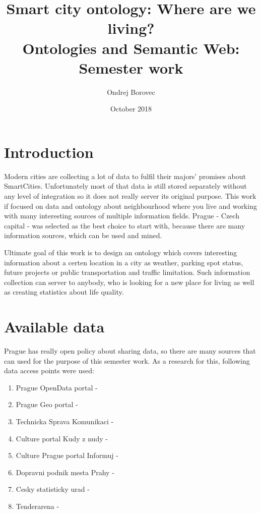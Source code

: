 \documentclass{article}
\title{Smart city ontology: Where are we living?\\ \large Ontologies and Semantic Web: Semester work}
\author{Ondrej Borovec}
\date{October 2018}
\begin{document}
\maketitle

\section{Introduction}

Modern cities are collecting a lot of data to fulfil their majors' promises about SmartCities. Unfortunately most of that data is still stored separately without any level of integration so it does not really server its original purpose. This work if focused on data and ontology about neighbourhood where you live and working with many interesting sources of multiple information fields. Prague - Czech capital - was selected as the best choice to start with, because there are many information sources, which can be used and mined.

Ultimate goal of this work is to design an ontology which covers interesting information about a certen location in a city as weather, parking spot status, future projects or public transportation and traffic limitation. Such information collection can server to anybody, who is looking for a new place for living as well as creating statistics about life quality.

\section{Available data}

Prague has really open policy about sharing data, so there are many sources that can used for the purpose of this semester work. As a research for this, following data access points were used:

\begin{enumerate}
    \item Prague OpenData portal - \cite{opendataprague:online}
    \item Prague Geo portal - \cite{geoportal:online}
    \item Technicka Sprava Komunikaci - \cite{tskpraha:online}
    \item Culture portal Kudy z nudy - \cite{kudyznudy:online}
    \item Culture Prague portal Informuj - \cite{informujpraha:online}
    \item Dopravni podnik mesta Prahy - \cite{dppczRSS:online}
    \item Cesky statisticky urad - \cite{csu:online}
    \item Tenderarena - \cite{tenderarena:online}
\end{enumerate} 
\end{document}
